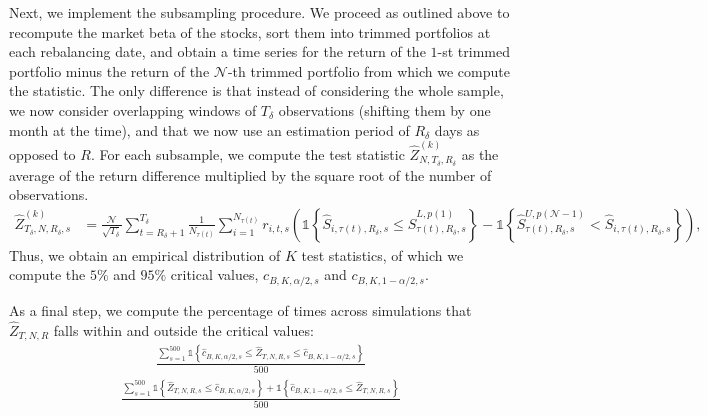 Next, we implement the subsampling procedure. We proceed as outlined above to recompute the market beta of the stocks, sort them into trimmed portfolios at each rebalancing date, and obtain a time series for the return of the $1$-st trimmed portfolio minus the return of the $\mathcal{N}$-th trimmed portfolio from which we compute the statistic. The only difference is that instead of considering the whole sample, we now consider overlapping windows of $T_\delta$ observations (shifting them by one month at the time), and that we now use an estimation period of $R_\delta$ days as opposed to $R$. For each subsample, we compute the test statistic $\widehat{Z}_{N,T_\delta,R_\delta}^{(k)}$ as the average of the return difference multiplied by the square root of the number of observations.
\begin{align*}
    \widehat{Z}_{T_\delta,N,R_\delta,s}^{(k)} &=\frac{\mathcal{N}}{\sqrt{T_\delta}}\sum_{t=R_\delta+1}^{T_\delta}\frac{1}{N_{\tau(t)}}\sum_{i=1}^{N_{\tau(t)}}r_{i,t,s}\left( \mathds{1} \left\{ \widehat{S}_{i,\tau(t),R_\delta,s}\leq \widehat{S}_{\tau(t),R_\delta,s}^{L, p(1)} \right\} -\mathds{1}\left\{  \widehat{S}_{\tau(t),R_\delta,s}^{U, p(\mathcal{N}-1)} < \widehat{S}_{i,\tau(t),R_\delta,s}\right\} \right), 
\end{align*}
Thus, we obtain an empirical distribution of $K$ test statistics, of which we compute the $5\%$ and $95\%$ critical values, $c_{B,K,\alpha/2,s}$ and $c_{B,K,1-\alpha/2,s}$. 

As a final step, we compute the percentage of times across simulations that $\widehat{Z}_{T,N,R}$ falls within and outside the critical values:
\begin{align*}
    \frac{\sum_{s=1}^{500} \mathds{1} \left\{ \widehat{c}_{B,K,\alpha/2,s} \leq \widehat{Z}_{T,N,R,s} \leq \widehat{c}_{B,K,1-\alpha/2,s} \right\}}{500} 
\end{align*}
\begin{align*}
    \frac{\sum_{s=1}^{500} \mathds{1} \left\{ \widehat{Z}_{T,N,R,s} \leq \widehat{c}_{B,K,\alpha/2,s} \right\} + \mathds{1} \left\{ \widehat{c}_{B,K,1-\alpha/2,s} \leq \widehat{Z}_{T,N,R,s} \right\}}{500} 
\end{align*}

